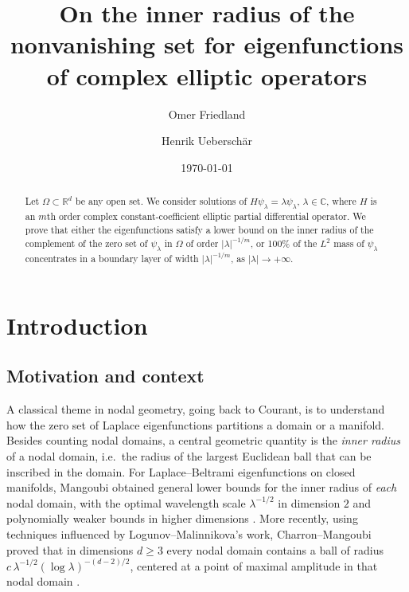 \documentclass[12pt, reqno]{amsart}
\theoremstyle{plain}
\theoremstyle{remark}
\newcommand{\C}{\mathbb{C}}
\newcommand{\R}{\mathbb{R}}
\begin{document}
\title[On the inner radius of the nonvanishing set]{On the inner radius of the nonvanishing set for eigenfunctions of complex elliptic operators}

\author{Omer Friedland}
\address{Institut de Math\'ematiques de Jussieu, Sorbonne Universit\'e, 4 place Jussieu, 75005 Paris}

\author{Henrik Uebersch\"ar}
\address{Institut de Math\'ematiques de Jussieu, Sorbonne Universit\'e, 4 place Jussieu, 75005 Paris}

\date{\today}

\begin{abstract}
Let $\Omega\subset\R^d$ be any open set.
We consider solutions of $H\psi_\lambda=\lambda \psi_\lambda$, $\lambda\in\C$, where $H$ is an $m$th order complex constant-coefficient elliptic partial differential operator. We prove that either the eigenfunctions satisfy a lower bound on the inner radius of the complement of the zero set of $\psi_\lambda$ in $\Omega$ of order $|\lambda|^{-1/m}$, or 100\% of the $L^2$ mass of $\psi_\lambda$ concentrates in a boundary layer of width $|\lambda|^{-1/m}$, as $|\lambda|\to+\infty$.
\end{abstract}

\maketitle

\section{Introduction}

\subsection{Motivation and context}

A classical theme in nodal geometry, going back to Courant, is to understand how the zero set of Laplace eigenfunctions partitions a domain or a manifold. Besides counting nodal domains, a central geometric quantity is the \emph{inner radius} of a nodal domain, i.e.\ the radius of the largest Euclidean ball that can be inscribed in the domain.
For Laplace--Beltrami eigenfunctions on closed manifolds, Mangoubi obtained general lower bounds for the inner radius of \emph{each} nodal domain, with the optimal wavelength scale $\lambda^{-1/2}$ in dimension $2$ and polynomially weaker bounds in higher dimensions \cite{Man08a,Man08b}. More recently, using techniques influenced by Logunov--Malinnikova's work, Charron--Mangoubi proved that in dimensions $d\ge 3$ every nodal domain contains a ball of radius $c\,\lambda^{-1/2}(\log\lambda)^{-(d-2)/2}$, centered at a point of maximal amplitude in that nodal domain \cite{ChMan24}.
\end{document}
